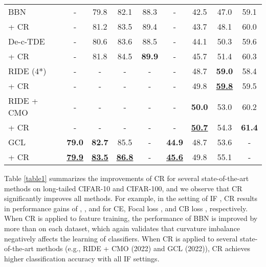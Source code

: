\documentclass[10pt,twocolumn,letterpaper]{article}
\begin{document}
\begin{table}[t]
\begin{small}
\begin{tabular}{l|cccc|cccc}
BBN \cite{paper5}     & \multicolumn{1}{c}{-}   & 79.8  &82.1   &88.3   & \multicolumn{1}{c}{-}   &42.5  &47.0  &59.1 \\ 
\rowcolor{blue!5}+ CR \cite{paper9}     & \multicolumn{1}{c}{-}   & 81.2  &83.5   &89.4   & \multicolumn{1}{c}{-}   &43.7 &48.1  &60.0 \\  \hline

De-c-TDE \cite{paper6} & \multicolumn{1}{c}{-}  &80.6  &83.6  &88.5   &\multicolumn{1}{c}{-}  & 44.1   & 50.3   &59.6   \\ 
\rowcolor{blue!5}+ CR    &\multicolumn{1}{c}{-}  &81.8  &84.5  &\textbf{89.9}   &\multicolumn{1}{c}{-}  & 45.7   & 51.4   &60.3   \\  \hline

RIDE (4*) \cite{paper7} & \multicolumn{1}{c}{-}  &\multicolumn{1}{c}{-}   &\multicolumn{1}{c}{-}   &\multicolumn{1}{c|}{-}   & \multicolumn{1}{c}{-}   &  48.7  & \textbf{59.0}  & 58.4   \\ 
\rowcolor{blue!5}+ CR & \multicolumn{1}{c}{-}  &\multicolumn{1}{c}{-}   &\multicolumn{1}{c}{-}   &\multicolumn{1}{c|}{-}   & \multicolumn{1}{c}{-}  & 49.8   & \underline{\textbf{59.8}}   &59.5   \\  \hline

RIDE + CMO \cite{paper8}   & \multicolumn{1}{c}{-} &\multicolumn{1}{c}{-} &\multicolumn{1}{c}{-} &\multicolumn{1}{c|}{-} &\multicolumn{1}{c}{-} &\textbf{50.0} &53.0 &60.2   \\  
\rowcolor{blue!5}+ CR & \multicolumn{1}{c}{-} &\multicolumn{1}{c}{-} &\multicolumn{1}{c}{-} &\multicolumn{1}{c|}{-} &\multicolumn{1}{c}{-} &\underline{\textbf{50.7}} &54.3 &\textbf{61.4}  \\ \hline

GCL \cite{paper9}    &\textbf{79.0}  & \textbf{82.7}  &85.5  &\multicolumn{1}{c|}{-}  &\textbf{44.9}  &48.7  &53.6  &\multicolumn{1}{c}{-}     \\
\rowcolor{blue!5}+ CR    &\underline{\textbf{79.9}}  & \underline{\textbf{83.5}}  &\underline{\textbf{86.8}}  &\multicolumn{1}{c|}{-}  &\underline{\textbf{45.6}}  &49.8  &55.1  &\multicolumn{1}{c}{-}  \\

\bottomrule \hline
\end{tabular}
\end{small}
\vskip -0.18in
\end{table}


Table \ref{table1} summarizes the improvements of CR for several state-of-the-art methods on long-tailed CIFAR-10 and CIFAR-100, and we observe that CR significantly improves all methods. For example, in the setting of IF , CR results in performance gains of , , and  for CE, Focal loss \cite{paper3}, and CB loss \cite{paper4}, respectively. When CR is applied to feature training, the performance of BBN \cite{paper5} is improved by more than  on each dataset, which again validates that curvature imbalance negatively affects the learning of classifiers. When CR is applied to several state-of-the-art methods (e.g., RIDE + CMO \cite{paper8} (2022) and GCL \cite{paper9} (2022)), CR achieves higher classification accuracy with all IF settings.
\end{document}

